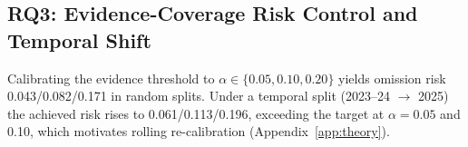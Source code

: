 \subsection{RQ3: Evidence-Coverage Risk Control and Temporal Shift}
\label{sec:rq3}

Calibrating the evidence threshold to $\alpha \in \{0.05, 0.10, 0.20\}$ yields omission risk 0.043/0.082/0.171 in random splits.
Under a temporal split (2023--24 $\to$ 2025) the achieved risk rises to 0.061/0.113/0.196, exceeding the target at $\alpha = 0.05$ and 0.10, which motivates rolling re-calibration (Appendix~\ref{app:theory}).
